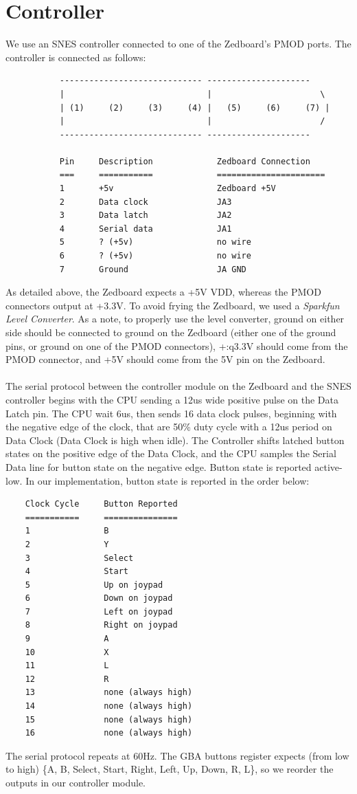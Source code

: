 \documentclass[11pt,a4paper]{article}
\begin{document}
	\section{Controller}
	We use an SNES controller connected to one of the Zedboard's PMOD ports. The controller is connected as follows:
	\begin{verbatim}
	       ----------------------------- ---------------------
	       |                             |                      \
	       | (1)     (2)     (3)     (4) |   (5)     (6)     (7) |
	       |                             |                      /
	       ----------------------------- ---------------------
	       
	       Pin     Description             Zedboard Connection
	       ===     ===========             ======================
	       1       +5v                     Zedboard +5V
	       2       Data clock              JA3
	       3       Data latch              JA2
	       4       Serial data             JA1
	       5       ? (+5v)                 no wire
	       6       ? (+5v)                 no wire
	       7       Ground                  JA GND
	\end{verbatim}
	As detailed above, the Zedboard expects a +5V VDD, whereas the PMOD connectors output at +3.3V. To avoid frying the Zedboard, we used a \textit{Sparkfun Level Converter}. As a note, to properly use the level converter, ground on either side should be connected to ground on the Zedboard (either one of the ground pins, or ground on one of the PMOD connectors), +:q3.3V should come from the PMOD connector, and +5V should come from the 5V pin on the Zedboard.\\\\
	The serial protocol between the controller module on the Zedboard and the SNES controller begins with the CPU sending a 12us wide positive pulse on the Data Latch pin. The CPU wait 6us, then sends 16 data clock pulses, beginning with the negative edge of the clock, that are 50\% duty cycle with a 12us period on Data Clock (Data Clock is high when idle). The Controller shifts latched button states on the positive edge of the Data Clock, and the CPU samples the Serial Data line for button state on the negative edge. Button state is reported active-low. In our implementation, button state is reported in the order below:\\
	\begin{verbatim}
    Clock Cycle     Button Reported
    ===========     ===============
    1               B
    2               Y
    3               Select
    4               Start
    5               Up on joypad
    6               Down on joypad
    7               Left on joypad
    8               Right on joypad
    9               A
    10              X
    11              L
    12              R
    13              none (always high)
    14              none (always high)
    15              none (always high)
    16              none (always high)
	\end{verbatim}
	The serial protocol repeats at 60Hz. The GBA buttons register expects (from low to high) \{A, B, Select, Start, Right, Left, Up, Down, R, L\}, so we reorder the outputs in our controller module.
	
\end{document}
